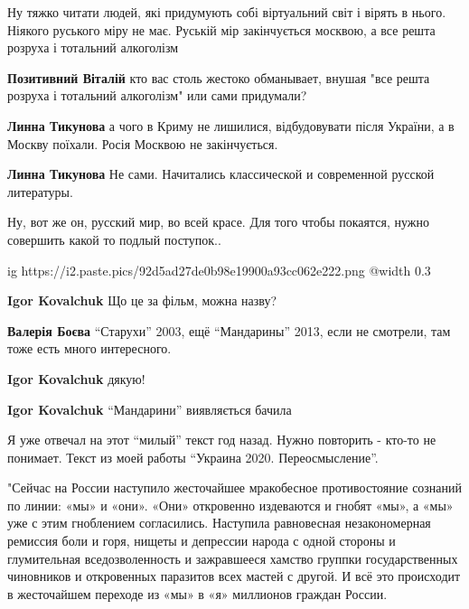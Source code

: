 \begin{itemize}
Ну тяжко читати людей, які придумують собі віртуальний світ і вірять в нього.
Ніякого руського міру не має. Руській мір закінчується москвою, а все решта
розруха і тотальний алкоголізм

\begin{itemize} %
\textbf{Позитивний Віталій} кто вас столь жестоко обманывает, внушая "все решта розруха і тотальний алкоголізм" или сами придумали?

\textbf{Линна Тикунова} а чого в Криму не лишилися, відбудовувати після України, а в Москву поїхали. Росія Москвою не закінчується.

\textbf{Линна Тикунова} Не сами. Начитались классической и современной русской литературы.
\end{itemize} %


Ну, вот же он, русский мир, во всей красе. Для того чтобы покаятся, нужно
совершить какой то подлый поступок..

\ifcmt
  ig https://i2.paste.pics/92d5ad27de0b98e19900a93cc062e222.png
  @width 0.3
\fi

\begin{itemize} %
\textbf{Igor Kovalchuk} Що це за фільм, можна назву?

\textbf{Валерія Боєва} \enquote{Старухи} 2003, ещё \enquote{Мандарины} 2013, если не смотрели, там тоже есть много интересного.

\textbf{Igor Kovalchuk} дякую!

\textbf{Igor Kovalchuk} \enquote{Мандарини} виявляється бачила
\end{itemize} %


Я уже отвечал на этот \enquote{милый} текст год назад. Нужно повторить - кто-то не
понимает. Текст из моей работы \enquote{Украина 2020. Переосмысление}. 

"Сейчас на России наступило жесточайшее мракобесное противостояние сознаний по
линии: «мы» и «они». «Они» откровенно издеваются и гнобят «мы», а «мы» уже с
этим гноблением согласились. Наступила равновесная незакономерная ремиссия боли
и горя, нищеты и депрессии народа с одной стороны и глумительная
вседозволенность и зажравшееся хамство группки государственных чиновников и
откровенных паразитов всех мастей с другой. И всё это происходит в жесточайшем
переходе из «мы» в «я» миллионов граждан России.


\end{itemize}
